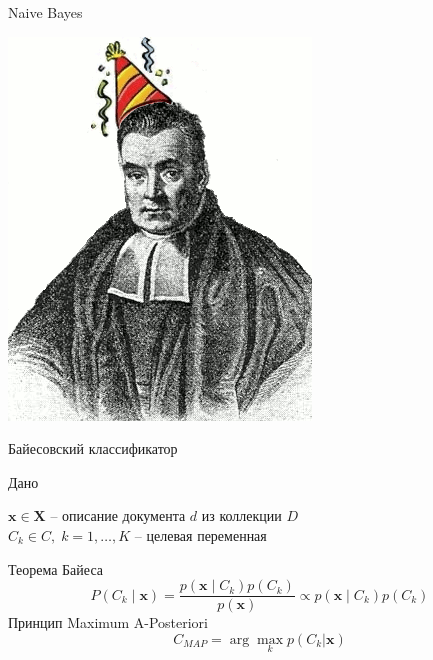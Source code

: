 \documentclass[aspectratio=169]{beamer}
\begin{document}
\begin{frame}{}

\begin{center}
\Large Naive Bayes

\vspace{1em}
\includegraphics[height=0.6\textheight]{images/bayes.png}
\end{center}

\end{frame}

\begin{frame}{Байесовский классификатор}

Дано

$\mathbf{x} \in \mathbf{X}$ -- описание документа $d$ из коллекции $D$ \\
$C_k \in C, \; k = 1,\ldots,K$ -- целевая переменная

\vspace{1em}
Теорема Байеса
\[
P(C_k \mid \mathbf{x}) = \frac{p(\mathbf{x} \mid C_k) p(C_k)}{p(\mathbf{x})} \propto p(\mathbf{x} \mid C_k) p(C_k)
\]
Принцип Maximum A-Posteriori
\[
C_{MAP} = \arg \max_k p(C_k | \mathbf{x})
\]

\end{frame}

\end{document}
